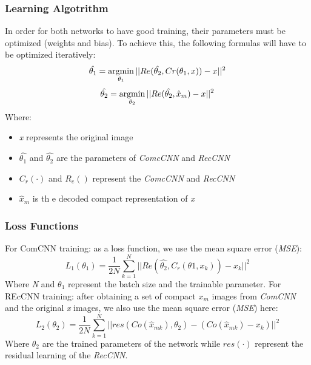 \subsubsection{Learning Algotrithm}
In order for both networks to have good training, their parameters must be 
optimized (weights and bias). To achieve this, the following formulas will 
have to be optimized iteratively:
\begin{equation}
    \hat{\theta_1} = \operatorname*{argmin}\limits_{\theta_1}||Re(\hat{\theta_2},Cr(\theta_1,x))-x||^2
\end{equation}
\begin{equation}
    \hat{\theta_2} = \operatorname*{argmin}\limits_{\theta_2}||Re(\hat{\theta_2},\hat{x}_m)-x||^2
\end{equation}
Where:
\begin{itemize}
    \item \emph{x} represents the original image
    \item $ \hat{\theta_1} $ and $ \hat{\theta_2} $ are the parameters of \emph{ComcCNN} and \emph{RecCNN}
    \item $ C_r(\cdot) $ and $ R_e() $ represent the \emph{ComcCNN} and \emph{RecCNN}
    \item $ \hat{x}_m $ is th e decoded compact representation of \emph{x}
\end{itemize}

\subsubsection{Loss Functions}
For ComCNN training: as a loss function, we use the mean square error (\emph{MSE}):
\begin{equation}
    L_1(\theta_1) = \frac{1}{2N}\sum_{k=1}^N||Re(\hat{\theta_2}, C_r(\theta1,x_k))-x_k||^2
\end{equation}
Where \emph{N} and $ \theta_1 $ represent the batch size and the trainable parameter.
For REcCNN training: after obtaining a set of compact $ x_m $ images from 
\emph{ComCNN} and the original \emph{x} images, we also use the mean square error 
(\emph{MSE}) here:
\begin{equation}
    L_2(\theta_2) = \frac{1}{2N}\sum_{k=1}^N||res(Co(\hat{x}_{mk}), \theta_2) - (Co(\hat{x}_{mk})-x_k)||^2
\end{equation}
Where $ \theta_2 $ are the trained parameters of the network while $ res(\cdot) $ represent 
the residual learning of the \emph{RecCNN}.


